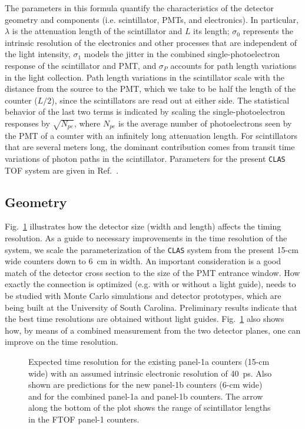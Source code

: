 The parameters in this formula quantify the characteristics of the detector 
geometry and components (i.e. scintillator, PMTs, and electronics).  In 
particular, $\lambda$ is the attenuation length of the scintillator and $L$ 
its length; $\sigma_0$ represents the intrinsic resolution of the electronics 
and other processes that are independent of the light intensity, $\sigma_1$ 
models the jitter in the combined single-photoelectron response of the 
scintillator and PMT, and $\sigma_P$ accounts for path length variations 
in the light collection.  Path length variations in the scintillator scale 
with the distance from the source to the PMT, which we take to be half the 
length of the counter ($L/2$), since the scintillators are read out at either 
side.  The statistical behavior of the last two terms is indicated by scaling 
the single-photoelectron responses by $\sqrt{N_{pe}}$, where $N_{pe}$ is the 
average number of photoelectrons seen by the PMT of a counter with an 
infinitely long attenuation length.  For scintillators that are several 
meters long, the dominant contribution comes from transit time variations of 
photon paths in the scintillator.  Parameters for the present {\tt CLAS} TOF 
system are given in Ref.~\cite{tof_note}.

\subsection{Geometry}

Fig.~\ref{sigma_tof} illustrates how the detector size (width and length) 
affects the timing resolution.  As a guide to necessary improvements in the 
time resolution of the system, we scale the parameterization of the 
{\tt CLAS} system from the present 15-cm wide counters down to 6~cm in width.
An important consideration is a good match of the detector cross section to 
the size of the PMT entrance window.  How exactly the connection is optimized
(e.g. with or without a light guide), needs to be studied with Monte Carlo 
simulations and detector prototypes, which are being built at the University 
of South Carolina.  Preliminary results indicate that the best time
resolutions are obtained without light guides.  Fig.~\ref{sigma_tof} also 
shows how, by means of a combined measurement from the two detector planes, 
one can improve on the time resolution.

\begin{figure}[t]
\vspace{8.0cm}
\caption{\small{Expected time resolution for the existing panel-1a counters
(15-cm wide) with an assumed intrinsic electronic resolution of 40~ps.  Also 
shown are predictions for the new panel-1b counters (6-cm wide) and for the
combined panel-1a and panel-1b counters.  The arrow along the bottom of the
plot shows the range of scintillator lengths in the FTOF panel-1 counters.}}
\label{sigma_tof}
\end{figure}

